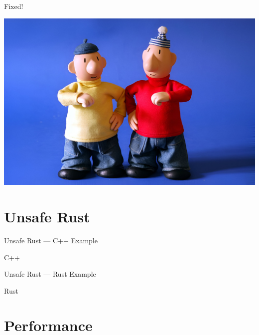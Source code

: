 \documentclass[10pt]{beamer}
\begin{document}
\begin{frame}{Fixed!}
    \begin{center}
        \includegraphics[width=\textwidth]{img/pat_a_mat.jpeg}
    \end{center}    
\end{frame}

\section{Unsafe Rust}

\begin{frame}{Unsafe Rust --- C++ Example}
   \begin{block}{C++}        
        
    \end{block}
\end{frame}

\begin{frame}{Unsafe Rust --- Rust Example}
   \begin{block}{Rust}        
        
    \end{block}
\end{frame}

\section{Performance}
\end{document}
